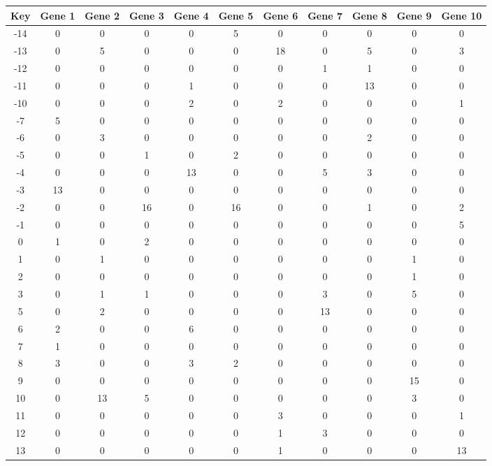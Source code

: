 \begin{tabular}{|c|c|c|c|c|c|c|c|c|c|c|}
\hline
Key & Gene 1 & Gene 2 & Gene 3 & Gene 4 & Gene 5 & Gene 6 & Gene 7 & Gene 8 & Gene 9 & Gene 10 \\
\hline
-14 & 0 & 0 & 0 & 0 & 5 & 0 & 0 & 0 & 0 & 0 \\
-13 & 0 & 5 & 0 & 0 & 0 & 18 & 0 & 5 & 0 & 3 \\
-12 & 0 & 0 & 0 & 0 & 0 & 0 & 1 & 1 & 0 & 0 \\
-11 & 0 & 0 & 0 & 1 & 0 & 0 & 0 & 13 & 0 & 0 \\
-10 & 0 & 0 & 0 & 2 & 0 & 2 & 0 & 0 & 0 & 1 \\
-7 & 5 & 0 & 0 & 0 & 0 & 0 & 0 & 0 & 0 & 0 \\
-6 & 0 & 3 & 0 & 0 & 0 & 0 & 0 & 2 & 0 & 0 \\
-5 & 0 & 0 & 1 & 0 & 2 & 0 & 0 & 0 & 0 & 0 \\
-4 & 0 & 0 & 0 & 13 & 0 & 0 & 5 & 3 & 0 & 0 \\
-3 & 13 & 0 & 0 & 0 & 0 & 0 & 0 & 0 & 0 & 0 \\
-2 & 0 & 0 & 16 & 0 & 16 & 0 & 0 & 1 & 0 & 2 \\
-1 & 0 & 0 & 0 & 0 & 0 & 0 & 0 & 0 & 0 & 5 \\
0 & 1 & 0 & 2 & 0 & 0 & 0 & 0 & 0 & 0 & 0 \\
1 & 0 & 1 & 0 & 0 & 0 & 0 & 0 & 0 & 1 & 0 \\
2 & 0 & 0 & 0 & 0 & 0 & 0 & 0 & 0 & 1 & 0 \\
3 & 0 & 1 & 1 & 0 & 0 & 0 & 3 & 0 & 5 & 0 \\
5 & 0 & 2 & 0 & 0 & 0 & 0 & 13 & 0 & 0 & 0 \\
6 & 2 & 0 & 0 & 6 & 0 & 0 & 0 & 0 & 0 & 0 \\
7 & 1 & 0 & 0 & 0 & 0 & 0 & 0 & 0 & 0 & 0 \\
8 & 3 & 0 & 0 & 3 & 2 & 0 & 0 & 0 & 0 & 0 \\
9 & 0 & 0 & 0 & 0 & 0 & 0 & 0 & 0 & 15 & 0 \\
10 & 0 & 13 & 5 & 0 & 0 & 0 & 0 & 0 & 3 & 0 \\
11 & 0 & 0 & 0 & 0 & 0 & 3 & 0 & 0 & 0 & 1 \\
12 & 0 & 0 & 0 & 0 & 0 & 1 & 3 & 0 & 0 & 0 \\
13 & 0 & 0 & 0 & 0 & 0 & 1 & 0 & 0 & 0 & 13 \\
\hline
\end{tabular}